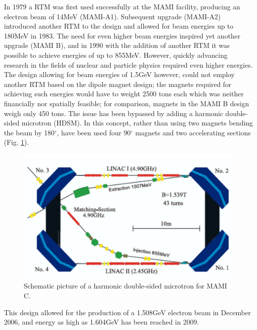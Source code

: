 In 1979 a RTM was first used successfully at the MAMI facility, producing an electron beam of 14MeV (MAMI-A1). Subsequent upgrade (MAMI-A2) introduced another RTM to the design and allowed for beam energies up to 180MeV in 1983. The need for even higher beam energies inspired yet another upgrade (MAMI B), and in 1990 with the addition of another RTM it was possible to achieve energies of up to 855MeV. However, quickly advancing research in the fields of nuclear and particle physics required even higher energies. The design allowing for beam energies of 1.5GeV however, could not employ another RTM based on the dipole magnet design; the magnets required for achieving such energies would have to weight 2500 tons each which was neither financially nor spatially feasible; for comparison, magnets in the MAMI B design weigh only 450 tons. The issue has been bypassed by adding a harmonic double-sided microtron (HDSM). In this concept, rather than using two magnets bending the beam by 180$^{\circ}$, have been used four 90$^{\circ}$ magnets and two accelerating sections (Fig. \ref{mamic}). 

\begin{figure}[H]
\begin{center}
\includegraphics[scale=0.25]{pictures/png/HDSM.png}
\caption{Schematic picture of a harmonic double-sided microtron for MAMI C.}
\label{mamic}
\end{center}
\end{figure}

This design allowed for the production of a 1.508GeV electron beam in December 2006, and energy as high as 1.604GeV has been reached in 2009.

